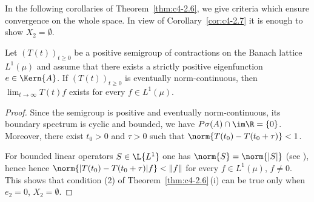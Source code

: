 In the following corollaries of Theorem~\ref{thm:c4-2.6}, we give criteria which ensure convergence on the whole space.
In view of Corollary~\ref{cor:c4-2.7} it is enough to show $X_{2} = \emptyset$.
\begin{corollary}\label{cor:c4-2.9}
%
Let $(T(t))_{t \geq 0}$ be a positive semigroup of contractions on the Banach lattice $L^{1}(\mu)$ and assume that there exists a strictly positive eigenfunction $e \in \Kern{A}$.
If\/ $(T(t))_{t \geq 0}$ is eventually norm-continuous, then $\lim_{t \to \infty}T(t)f$ exists for every $f \in L^{1}(\mu)$.
\end{corollary}
\begin{proof}
Since the semigroup is positive and eventually norm-continuous, its boundary spectrum is cyclic and bounded, \ie  we have $P{\sigma}(A) \cap \im\R = \{0\}$.
Moreover, there exist $t_{0} > 0$ and $\tau > 0$ such that $\norm{T(t_{0}) - T(t_{0}+\tau)} < 1$.

For bounded linear operators $S \in \L{L^{1}}$ 
one has $\norm{S} = \norm{\lvert S \rvert}$ 
(see \textcite[IV, Theorem 1.5]{schaefer:1974}), 
hence 
hence $ \norm{ \lvert T(t_{0}) - T(t_{0}+\tau) \rvert f} < \|f\|$ for every $f \in L^{1}(\mu)$, $f \neq 0$.
This shows that condition (2) of Theorem~\ref{thm:c4-2.6}\,(i) can be true only when $e_{2} = 0$, \ie  $X_{2} = \emptyset$.
\end{proof}

